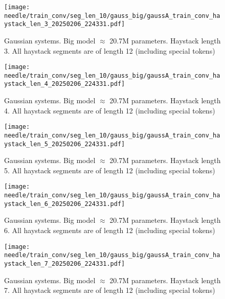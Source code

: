 \begin{figure}[h]
    \centering
    \texttt{[image: needle/train\_conv/seg\_len\_10/gauss\_big/gaussA\_train\_conv\_haystack\_len\_3\_20250206\_224331.pdf]}
    \caption{Gaussian systems. Big model $\approx$ 20.7M parameters. Haystack length 3. All haystack segments are of length 12 (including special tokens)}
    \label{fig:gauss_small_needle_train_conv_haystack_len_3_all_haystack_len_12}

\end{figure}

\begin{figure}[h]
    \centering
    \texttt{[image: needle/train\_conv/seg\_len\_10/gauss\_big/gaussA\_train\_conv\_haystack\_len\_4\_20250206\_224331.pdf]}
    \caption{Gaussian systems. Big model $\approx$ 20.7M parameters. Haystack length 4. All haystack segments are of length 12 (including special tokens)}
    \label{fig:gauss_small_needle_train_conv_haystack_len_4_all_haystack_len_12}

\end{figure}

\begin{figure}[h]
    \centering
    \texttt{[image: needle/train\_conv/seg\_len\_10/gauss\_big/gaussA\_train\_conv\_haystack\_len\_5\_20250206\_224331.pdf]}
    \caption{Gaussian systems. Big model $\approx$ 20.7M parameters. Haystack length 5. All haystack segments are of length 12 (including special tokens)}
    \label{fig:gauss_small_needle_train_conv_haystack_len_5_all_haystack_len_12}

\end{figure}

\begin{figure}[h]
    \centering
    \texttt{[image: needle/train\_conv/seg\_len\_10/gauss\_big/gaussA\_train\_conv\_haystack\_len\_6\_20250206\_224331.pdf]}
    \caption{Gaussian systems. Big model $\approx$ 20.7M parameters. Haystack length 6. All haystack segments are of length 12 (including special tokens)}
    \label{fig:gauss_small_needle_train_conv_haystack_len_6_all_haystack_len_12}

\end{figure}

\begin{figure}[h]
    \centering
    \texttt{[image: needle/train\_conv/seg\_len\_10/gauss\_big/gaussA\_train\_conv\_haystack\_len\_7\_20250206\_224331.pdf]}
    \caption{Gaussian systems. Big model $\approx$ 20.7M parameters. Haystack length 7. All haystack segments are of length 12 (including special tokens)}
    \label{fig:gauss_small_needle_train_conv_haystack_len_7_all_haystack_len_12}

\end{figure}


